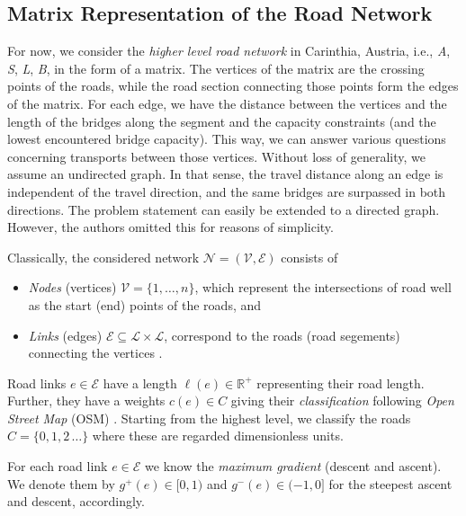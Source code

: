 %
\subsection{Matrix Representation of the Road Network}

For now, we consider the \textit{higher level road network} in Carinthia, Austria,
i.e., \textit{A}, \textit{S}, \textit{L}, \textit{B}, in the  form of a matrix.
The vertices of the matrix are the crossing points of the roads, while
the road section connecting those points form the edges of the matrix.
For each edge, we have the distance between the vertices and the length of the bridges along the segment
and the capacity constraints (and the lowest encountered bridge capacity).
This way, we can answer various questions concerning transports between those vertices.
Without loss of generality, we assume an undirected graph.
In that sense, the travel distance along an edge is independent of
the travel direction, and  the same bridges are surpassed in both directions.
The problem statement can
easily be extended to a directed graph. However, the authors omitted this for reasons of simplicity.

Classically,  the considered network $\mathcal{N}=(\mathcal{V},\mathcal{E})$ consists of
\begin{itemize}
  \item \emph{Nodes} (vertices) $\mathcal{V}=\{1,\ldots, n\}$, which represent the intersections of road
  well as the start (end) points of the roads, and

  \item \emph{Links} (edges) $\mathcal{E} \subseteq \mathcal{L} \times \mathcal{L}$,
  correspond to the roads (road segements) connecting the vertices \cite{liedtke2012generation}.
\end{itemize}

Road links $e \in \mathcal{E}$ have a length $\ell(e)\in \mathbb{R}^{+}$ representing their road length.
Further, they have a weights $c(e) \in C$ giving their \emph{classification} following \textit{Open Street Map} (OSM) \cite{OpenStreetMap}. Starting from the highest level, we classify the roads
$C=\{0,1,2\,\ldots\}$ where these are regarded dimensionless units.

For each road link  $e \in \mathcal{E}$ we know the \emph{maximum gradient} (descent and ascent). We denote them by $g^{+}(e) \in [0,1)$ and  $g^{-}(e) \in (-1,0]$ for the steepest ascent and descent, accordingly.

